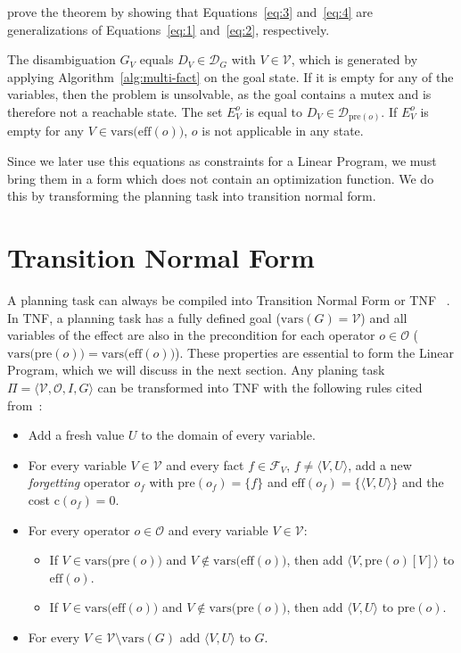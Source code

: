 \cite{fivser2020strengthening} prove the theorem by showing that Equations~\eqref{eq:3} and~\eqref{eq:4} are generalizations of Equations~\eqref{eq:1} and~\eqref{eq:2}, respectively.

The disambiguation $G_V$ equals $D_V\in\mathcal{D}_G$ with $V\in\mathcal{V}$, which is generated by applying Algorithm~\ref{alg:multi-fact} on the goal state.
If it is empty for any of the variables, then the problem is unsolvable, as the goal contains a mutex and is therefore not a reachable state.
The set $E_V^o$ is equal to $D_V\in\mathcal{D}_{\text{pre}(o)}$.
If $E^o_V$ is empty for any $V\in\text{vars(eff}(o))$, $o$ is not applicable in any state.

Since we later use this equations as constraints for a Linear Program, we must bring them in a form which does not contain an optimization function.
We do this by transforming the planning task into transition normal form.

\section{Transition Normal Form}\label{sec:transition-normal-form}
A planning task can always be compiled into Transition Normal Form or TNF ~\citep{pommerening2015normal}.
In TNF, a planning task has a fully defined goal ($\text{vars}(G)=\mathcal{V}$) and all variables of the effect are also in the precondition for each operator $o\in\mathcal{O}$ ($\text{vars(pre}(o)) = \text{vars(eff}(o))$).
These properties are essential to form the Linear Program, which we will discuss in the next section.
Any planing task  $\Pi = \langle \mathcal{V}, \mathcal{O}, I, G \rangle$ can be transformed into TNF with the following rules cited from~\cite{fivser2020strengthening}:
\begin{itemize}
    \item Add a fresh value $U$ to the domain of every variable.
    \item For every variable $V\in\mathcal{V}$ and every fact $f\in\mathcal{F}_V$, $f\neq\langle V,U\rangle$, add a new \textit{forgetting} operator $o_f$ with $\text{pre}(o_f)=\{f\}$ and $\text{eff}(o_f)=\{\langle V,U\rangle\}$ and the cost $\text{c}(o_f)=0$.
    \item For every operator $o\in\mathcal{O}$ and every variable $V\in\mathcal{V}$:
    \begin{itemize}
        \item If $V\in\text{vars(pre}(o))$ and $V\notin\text{vars(eff}(o))$, then add $\langle V,\text{pre}(o)[V]\rangle$ to $\text{eff}(o)$.
        \item If $V\in\text{vars(eff}(o))$ and $V\notin\text{vars(pre}(o))$, then add $\langle V,U\rangle$ to $\text{pre}(o)$.
    \end{itemize}
    \item For every $V\in\mathcal{V}\setminus\text{vars}(G)$ add $\langle V,U\rangle$ to $G$.
\end{itemize}

